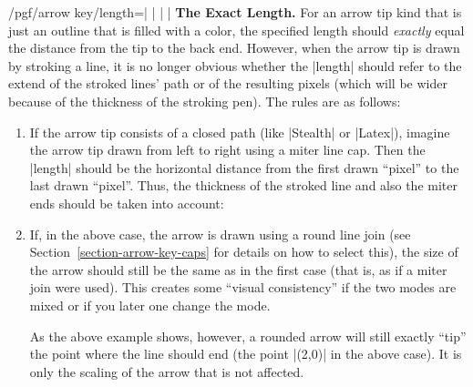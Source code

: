 \begin{key}{/pgf/arrow key/length=| |%
    | |}
  \medskip
  \noindent \textbf{The Exact Length.}
  For an arrow tip kind that is just an outline that is filled with a
  color, the specified length should \emph{exactly} equal the distance
  from the tip to the back end. However, when the arrow tip is drawn
  by stroking a line, it is no longer obvious whether the |length|
  should refer to the extend of the stroked lines' path or of the
  resulting pixels (which will be wider because of the thickness of
  the stroking pen). The rules are as follows:
  \begin{enumerate}
  \item If the arrow tip consists of a closed path (like |Stealth| or
    |Latex|), imagine the arrow tip drawn from left to right using a
    miter line cap. Then the |length| should be the horizontal
    distance from the first drawn ``pixel'' to the last drawn
    ``pixel''. Thus, the thickness of the stroked line and also the
    miter ends should be taken into account:
\begin{codeexample}[]
\end{codeexample}
  \item If, in the above case, the arrow is drawn using a round line
    join (see Section~\ref{section-arrow-key-caps} for details on how
    to select this), the size of the arrow should still be the same as
    in the first case (that is, as if a miter join were used). This
    creates some ``visual consistency'' if the two modes are mixed or
    if you later one change the mode.
\begin{codeexample}[]
\end{codeexample}
    As the above example shows, however, a rounded arrow will still
    exactly ``tip'' the point where the line should end (the point
    |(2,0)| in the above case). It is only the scaling of the arrow
    that is not affected.
  \end{enumerate}
\end{key}

